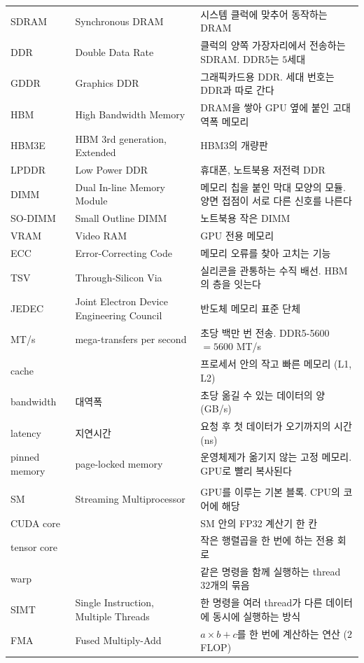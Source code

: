 \documentclass[11pt,a4paper]{article}
\begin{document}
{\begin{longtable}{@{}>{\raggedright\arraybackslash}p{24mm}>{\raggedright\arraybackslash}p{50mm}>{\raggedright\arraybackslash}p{76mm}@{}}
SDRAM & Synchronous DRAM & 시스템 클럭에 맞추어 동작하는 DRAM \\
DDR & Double Data Rate & 클럭의 양쪽 가장자리에서 전송하는 SDRAM. DDR5는 $5$세대 \\
GDDR & Graphics DDR & 그래픽카드용 DDR. 세대 번호는 DDR과 따로 간다 \\
HBM & High Bandwidth Memory & DRAM을 쌓아 GPU 옆에 붙인 고대역폭 메모리 \\
HBM3E & HBM 3rd generation, Extended & HBM3의 개량판 \\
LPDDR & Low Power DDR & 휴대폰, 노트북용 저전력 DDR \\
DIMM & Dual In-line Memory Module & 메모리 칩을 붙인 막대 모양의 모듈. 양면 접점이 서로 다른 신호를 나른다 \\
SO-DIMM & Small Outline DIMM & 노트북용 작은 DIMM \\
VRAM & Video RAM & GPU 전용 메모리 \\
ECC & Error-Correcting Code & 메모리 오류를 찾아 고치는 기능 \\
TSV & Through-Silicon Via & 실리콘을 관통하는 수직 배선. HBM의 층을 잇는다 \\
JEDEC & Joint Electron Device Engineering Council & 반도체 메모리 표준 단체 \\
MT/s & mega-transfers per second & 초당 백만 번 전송. DDR5-5600 $=5600$ MT/s \\
cache & & 프로세서 안의 작고 빠른 메모리 (L1, L2) \\
bandwidth & 대역폭 & 초당 옮길 수 있는 데이터의 양 (GB/s) \\
latency & 지연시간 & 요청 후 첫 데이터가 오기까지의 시간 (ns) \\
pinned memory & page-locked memory & 운영체제가 옮기지 않는 고정 메모리. GPU로 빨리 복사된다 \\
\multicolumn{3}{@{}l}{\textbf{GPU의 내부}} \\
SM & Streaming Multiprocessor & GPU를 이루는 기본 블록. CPU의 코어에 해당 \\
CUDA core & & SM 안의 FP32 계산기 한 칸 \\
tensor core & & 작은 행렬곱을 한 번에 하는 전용 회로 \\
warp & & 같은 명령을 함께 실행하는 thread $32$개의 묶음 \\
SIMT & Single Instruction, Multiple Threads & 한 명령을 여러 thread가 다른 데이터에 동시에 실행하는 방식 \\
FMA & Fused Multiply-Add & $a\times b+c$를 한 번에 계산하는 연산 ($2$ FLOP) \\

\end{longtable}}
\end{document}
